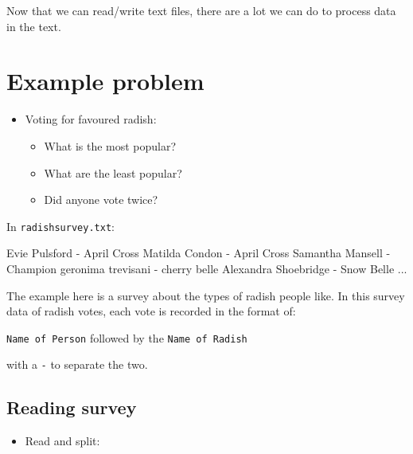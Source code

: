 \documentclass[
  letterpaper,
]{scrbook}
\newenvironment{Shaded}{\begin{snugshade}}{\end{snugshade}}
\newcommand{\NormalTok}[1]{\textcolor[rgb]{0.00,0.23,0.31}{#1}}
\providecommand{\tightlist}{%
  \setlength{\itemsep}{0pt}\setlength{\parskip}{0pt}}
\begin{document}

Now that we can read/write text files, there are a lot we can do to
process data in the text.

\section*{Example problem}\label{example-problem}


\begin{itemize}
\tightlist
\item
  Voting for favoured radish:

  \begin{itemize}
  \tightlist
  \item
    What is the most popular?
  \item
    What are the least popular?
  \item
    Did anyone vote twice?
  \end{itemize}
\end{itemize}

In \texttt{radishsurvey.txt}:

\begin{Shaded}
\begin{Highlighting}[]
\NormalTok{Evie Pulsford {-} April Cross}
\NormalTok{Matilda Condon {-} April Cross}
\NormalTok{Samantha Mansell {-} Champion}
\NormalTok{geronima trevisani {-} cherry belle}
\NormalTok{Alexandra Shoebridge {-} Snow Belle}
\NormalTok{...}
\end{Highlighting}
\end{Shaded}

The example here is a survey about the types of radish people like. In
this survey data of radish votes, each vote is recorded in the format
of:

\texttt{Name\ of\ Person} followed by the \texttt{Name\ of\ Radish}

with a \texttt{-} to separate the two.

\subsection*{Reading survey}\label{reading-survey}

\begin{itemize}
\tightlist
\item
  Read and split:
\end{itemize}
\end{document}
